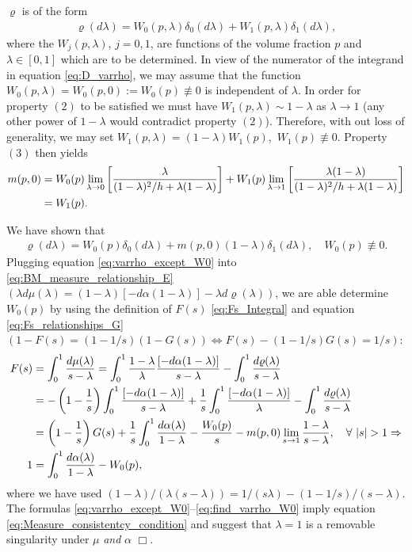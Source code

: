 \documentclass[english,12pt]{ttuthes}
\begin{document}
$\varrho$ is of the form   
%
\begin{align*}
  \varrho(d\lambda)=W_0(p,\lambda)\delta_0(d\lambda)+W_1(p,\lambda)\delta_1(d\lambda),
\end{align*}
%
where the $W_j(p,\lambda)$, $j=0,1$, are functions of the volume fraction
$p$ and $\lambda\in[0,1]$ which are to be determined. In view of the numerator
of the integrand in equation \eqref{eq:D_varrho}, we may assume that
the function $W_0(p,\lambda)=W_0(p,0):=W_0(p)\not\equiv0$ is independent of
$\lambda$. In order for property $(2)$ to be satisfied we must have
$W_1(p,\lambda)\sim1-\lambda$ as $\lambda\to1$ (any other power of $1-\lambda$ would contradict
property $(2)$). Therefore, with out loss of generality, we may set  
$W_1(p,\lambda)=(1-\lambda)W_1(p)$, $\,W_1(p)\not\equiv0$. Property $(3)$ then yields     
%
\begin{align}
  m(p,0)&=W_0(p)\lim_{\lambda\to0}\left[\frac{\lambda}{(1-\lambda)^2/h+\lambda(1-\lambda)}\right]
        +W_1(p)\lim_{\lambda\to1}\left[\frac{\lambda(1-\lambda)}{(1-\lambda)^2/h+\lambda(1-\lambda)}\right]
        \notag\\
        &=W_1(p).
\end{align}
%

We have shown that
%
\begin{align}\label{eq:varrho_except_W0}
  \varrho(d\lambda)=W_0(p)\delta_0(d\lambda)+m(p,0)(1-\lambda)\delta_1(d\lambda), \quad W_0(p)\not\equiv0.
\end{align}
%
Plugging equation \eqref{eq:varrho_except_W0} into 
\eqref{eq:BM_measure_relationship_E} $(\lambda d\mu(\lambda)=(1-\lambda)[-d\alpha(1-\lambda)] - \lambda d\varrho(\lambda))$,
we are able determine $W_0(p)$ by using the definition of $F(s)$
\eqref{eq:Fs_Integral} and equation \eqref{eq:Fs_relationships_G}
$(1-F(s)=(1-1/s)(1-G(s))\iff F(s)-(1-1/s)G(s)=1/s)$: 
%
\begin{align}\label{eq:find_varrho_W0}
  F(s)&=\int_0^1\frac{d\mu(\lambda)}{s-\lambda}=\int_0^1\frac{1-\lambda}{\lambda}\frac{[-d\alpha(1-\lambda)]}{s-\lambda}
                           -\int_0^1\frac{d\varrho(\lambda)}{s-\lambda}\notag\\
      &=-\left(1-\frac{1}{s}\right)\int_0^1\frac{[-d\alpha(1-\lambda)]}{s-\lambda}
         +\frac{1}{s}\int_0^1\frac{[-d\alpha(1-\lambda)]}{\lambda} -\int_0^1\frac{d\varrho(\lambda)}{s-\lambda}
       \notag\\
      &=\left(1-\frac{1}{s}\right)G(s)+\frac{1}{s}\int_0^1\frac{d\alpha(\lambda)}{1-\lambda}
         -\frac{W_0(p)}{s}-m(p,0)\lim_{s\to1}\frac{1-\lambda}{s-\lambda}, \quad
         \forall \ |s|>1 \Rightarrow\notag\\
      1&=\int_0^1\frac{d\alpha(\lambda)}{1-\lambda}-W_0(p),  
\end{align}
%
where we have used $(1-\lambda)/(\lambda(s-\lambda))=1/(s\lambda)-(1-1/s)/(s-\lambda)$.
The formulas \eqref{eq:varrho_except_W0}--\eqref{eq:find_varrho_W0}
imply equation \eqref{eq:Measure_consistentcy_condition} and suggest
that $\lambda=1$ is a removable singularity under $\mu$ \emph{and} $\alpha$ $\Box$.
\end{document}
